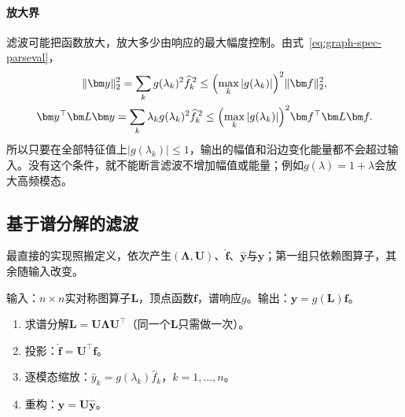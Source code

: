 \paragraph{放大界}
滤波可能把函数放大，放大多少由响应的最大幅度控制。由式~\eqref{eq:graph-spec-parseval}，
\begin{equation}
 \begin{gathered}
 \lVert\bm y\rVert_2^2=\sum_kg(\lambda_k)^2\widehat f_k^{\,2}\leq\Bigl(\max_k|g(\lambda_k)|\Bigr)^2\lVert\bm f\rVert_2^2,\\
 \bm y^{\top}\bm L\bm y=\sum_k\lambda_kg(\lambda_k)^2\widehat f_k^{\,2}\leq\Bigl(\max_k|g(\lambda_k)|\Bigr)^2\bm f^{\top}\bm L\bm f .
 \end{gathered}
 \label{eq:graph-spec-filter-bound}
\end{equation}
所以只要在全部特征值上$|g(\lambda_k)|\leq1$，输出的幅值和沿边变化能量都不会超过输入。没有这个条件，就不能断言滤波不增加幅值或能量；例如$g(\lambda)=1+\lambda$会放大高频模态。

\subsection{基于谱分解的滤波}
\label{sec:graph-spec-eigendecomposition-filter}

最直接的实现照搬定义，依次产生$(\bm\Lambda,\bm U)$、$\widehat{\bm f}$、$\widehat{\bm y}$与$\bm y$；第一组只依赖图算子，其余随输入改变。

\begin{algorithm}[基于谱分解的图滤波]
\label{alg:graph-spec-eigendecomposition-filter}
输入：$n\times n$实对称图算子$\bm L$，顶点函数$\bm f$，谱响应$g$。输出：$\bm y=g(\bm L)\bm f$。
\begin{enumerate}
 \item 求谱分解$\bm L=\bm U\bm\Lambda\bm U^{\top}$（同一个$\bm L$只需做一次）。
 \item 投影：$\widehat{\bm f}=\bm U^{\top}\bm f$。
 \item 逐模态缩放：$\widehat y_k=g(\lambda_k)\widehat f_k$，$k=1,\ldots,n$。
 \item 重构：$\bm y=\bm U\widehat{\bm y}$。
\end{enumerate}
\end{algorithm}


